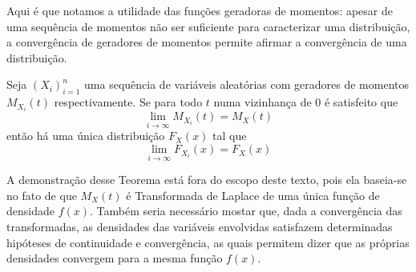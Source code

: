 Aqui é que notamos a utilidade das funções geradoras de momentos: apesar de uma sequência
de momentos não ser suficiente para caracterizar uma distribuição, a convergência de
geradores de momentos permite afirmar a convergência de uma distribuição.

\begin{thm:convergencia mgf}
\label{thm:convergencia mgf}
Seja $(X_i)_{i=1}^n$ uma sequência de variáveis aleatórias com geradores de momentos
$M_{X_i}(t)$ respectivamente.
Se para todo $t$ numa vizinhança de $0$ é satisfeito que
\[
    \lim_{i \to \infty} M_{X_i}(t) = M_X(t)
\]
então há uma única distribuição $F_X(x)$ tal que
\[
    \lim_{i \to \infty} F_{X_i}(x) = F_X(x)
\]
\end{thm:convergencia mgf}

A demonstração desse Teorema está fora do escopo deste texto, pois ela baseia-se no fato
de que $M_X(t)$ é Transformada de Laplace de uma única função de densidade $f(x)$.
Também seria necessário mostar que, dada a convergência das transformadas, as densidades
das variáveis envolvidas satisfazem determinadas hipóteses de continuidade e convergência,
as quais permitem dizer que as próprias densidades convergem para a mesma função $f(x)$.
